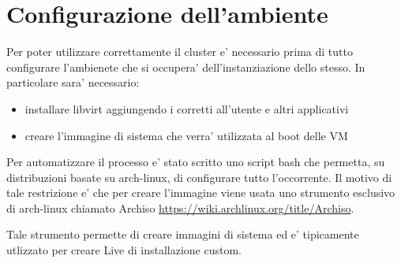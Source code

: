 \usepackage{url}


\section{Configurazione dell'ambiente}
Per poter utilizzare correttamente il cluster e' necessario prima di tutto configurare
l'ambienete che si occupera' dell'instanziazione dello stesso. In particolare sara' necessario:
\begin{itemize}
    \item installare libvirt aggiungendo i corretti all'utente e altri applicativi
    \item creare l'immagine di sistema che verra' utilizzata al boot delle VM
\end{itemize}

Per automatizzare il processo e' stato scritto uno script bash che permetta, 
su distribuzioni basate su arch-linux, di configurare tutto l'occorrente.
Il motivo di tale restrizione e' che per creare l'immagine viene usata uno strumento
esclusivo di arch-linux chiamato Archiso \url{https://wiki.archlinux.org/title/Archiso}.

Tale strumento permette di creare immagini di sistema ed e' tipicamente utlizzato per creare 
Live di installazione custom. 
